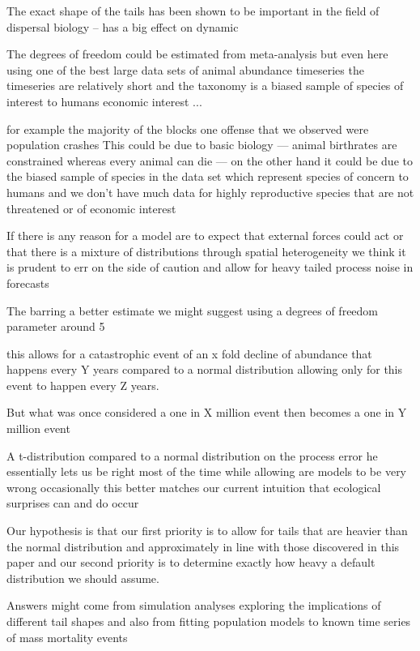 The exact shape of the tails has been shown to be important in the field of
dispersal biology -- has a big effect on dynamic \citep{kot1996}
\citep{clark1999}
\citep{kot1996}

The degrees of
freedom could be estimated from meta-analysis but even here using one of the
best large data sets of animal abundance timeseries the timeseries are
relatively short and the taxonomy is a biased sample of species of interest to humans  economic
interest ...

for example the majority of the blocks one offense that we observed were
population crashes This could be due to basic biology --- animal birthrates are
constrained whereas every animal can die --- on the other hand it could be due
to the biased sample of species in the data set which represent species of
concern to humans and we don't have much data for highly reproductive species
that are not threatened or of economic interest

If there is any reason for a model are to expect that external forces could act
or that there is a mixture of distributions through spatial heterogeneity we
think it is prudent to err on the side of caution and allow for heavy tailed
process noise in forecasts

The barring a better estimate we might suggest using a degrees of freedom parameter around 5

this allows for a catastrophic event of an x fold decline of abundance that
happens every Y years compared to a normal distribution allowing only for this
event to happen every Z years.

But what was once considered a one in X million event then becomes a one in Y
million event

A t-distribution compared to a normal distribution on the process error he
essentially lets us be right most of the time while allowing are models to be
very wrong occasionally this better matches our current intuition that
ecological surprises can and do occur

Our hypothesis is that our first priority is to allow for tails that are
heavier than the normal distribution and approximately in line with those
discovered in this paper and our second priority is to determine exactly how
heavy a default distribution we should assume.

Answers might come from simulation analyses exploring the implications of
different tail shapes and also from fitting population models to known time
series of mass mortality events \citep[e.g.][]{fey2015}

